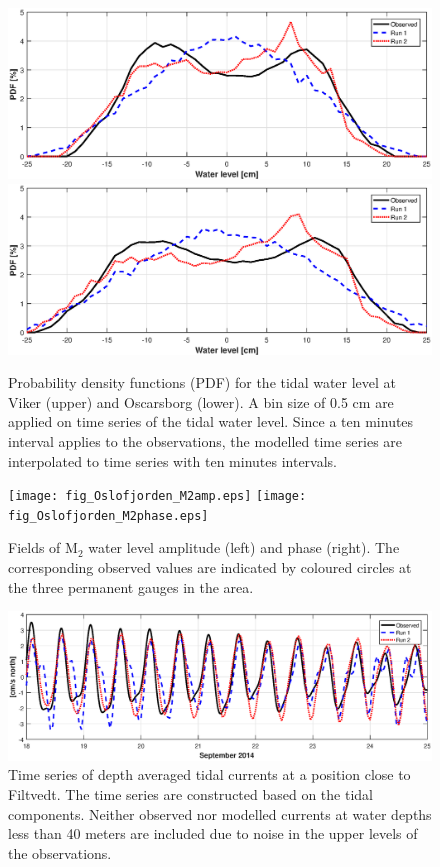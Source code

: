 \begin{figure}[!t]
\centering
\includegraphics[width=\textwidth]{fig_Viker_PDF}
\includegraphics[width=\textwidth]{fig_Oscarsborg_PDF}
\caption{Probability density functions (PDF) for the tidal water level at Viker (upper) and Oscarsborg (lower). A bin size of 0.5 cm are applied on time series of the tidal water level. Since a ten minutes interval applies to the observations, the modelled time series are interpolated to time series with ten minutes intervals.}
\label{fig:Oslo_PDF}
\end{figure}


\begin{figure}[!t]
\centering
\texttt{[image: fig\_Oslofjorden\_M2amp.eps]}
\texttt{[image: fig\_Oslofjorden\_M2phase.eps]}
\caption{Fields of M$_2$ water level amplitude (left) and phase (right). The corresponding observed values are indicated by coloured circles at the three permanent gauges in the area.}
\label{fig:Oslofjord_tidal_fields}
\end{figure}


\begin{figure}[!t]
\centering
\includegraphics[width=\textwidth]{fig_Filtvedt_timeseries}
\caption{Time series of depth averaged tidal currents at a position close to Filtvedt. The time series are constructed based on the tidal components. Neither observed nor modelled currents at water depths less than 40 meters are included due to noise in the upper levels of the observations.}
\label{fig:Filtvedt_timeseries}
\end{figure}



